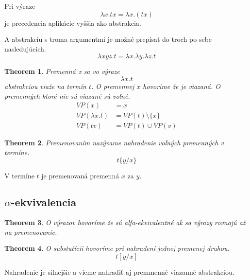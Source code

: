 \documentclass[a4paper,10pt,oneside]{report}%
\newtheorem{theorem}{Theorem}
\begin{document}
Pri výraze
\begin{equation}
    \lambda x . t x = \lambda x . (t x)
\end{equation}
je precedencia aplikácie vyššia ako abstrakcia.

A abstrakciu s troma argumentmi je možné prepísať do troch po sebe nasledujúcich.
\begin{equation}
    \lambda x y z . t = \lambda x . \lambda y . \lambda z . t
\end{equation}

\begin{theorem}
    Premenná x sa vo výraze
    \begin{equation}
        \lambda x . t
    \end{equation}
    abstrakciou viaže na termín $t$. O premennej $x$ hovoríme že je viazaná.
    O premenných ktoré nie sú viazané sú voľné.
    \begin{align*}
        VP(x) &= {x} \\
        VP(\lambda x.t) &= VP(t)  \setminus \{x\} \\
        VP(t v) &= VP(t) \cup VP(v)
    \end{align*}
\end{theorem}

\begin{theorem}
    Premenovaním nazývame nahradenie voľných premenných v termíne.
    \begin{equation}
        t \{ y / x \}
    \end{equation}
\end{theorem}
V termíne $t$ je premenovaná premenná $x$ za $y$.

\subsection{$\alpha$-ekvivalencia}
\begin{theorem}
    O výrazov hovoríme že sú alfa-ekvivalentné ak sa výrazy rovnajú až na premenovanie.
\end{theorem}

\begin{theorem}
    O substutícii hovoríme pri nahradení jednej premenej druhou.
    \begin{equation}
        t [ y / x ]
    \end{equation}
\end{theorem}

Nahradenie je silnejšie a vieme nahradiť aj premmenné viazanné abstrakciou.
\end{document}
